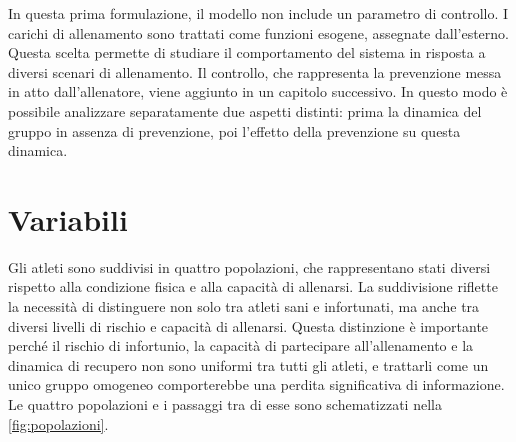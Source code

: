 In questa prima formulazione, il modello non include un parametro di controllo. I carichi di allenamento sono trattati come funzioni esogene, assegnate dall'esterno. Questa scelta permette di studiare il comportamento del sistema in risposta a diversi scenari di allenamento. Il controllo, che rappresenta la prevenzione messa in atto dall'allenatore, viene aggiunto in un capitolo successivo. In questo modo è possibile analizzare separatamente due aspetti distinti: prima la dinamica del gruppo in assenza di prevenzione, poi l'effetto della prevenzione su questa dinamica.

\section{Variabili}

Gli atleti sono suddivisi in quattro popolazioni, che rappresentano stati diversi rispetto alla condizione fisica e alla capacità di allenarsi. La suddivisione riflette la necessità di distinguere non solo tra atleti sani e infortunati, ma anche tra diversi livelli di rischio e capacità di allenarsi. Questa distinzione è importante perché il rischio di infortunio, la capacità di partecipare all'allenamento e la dinamica di recupero non sono uniformi tra tutti gli atleti, e trattarli come un unico gruppo omogeneo comporterebbe una perdita significativa di informazione. Le quattro popolazioni e i passaggi tra di esse sono schematizzati nella \autoref{fig:popolazioni}.

